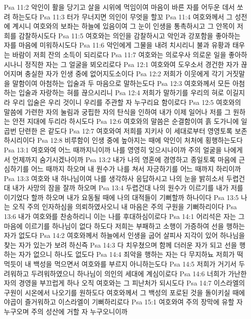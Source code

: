 Psa 11:2  악인이 활을 당기고 살을 시위에 먹임이여 마음이 바른 자를 어두운 데서 쏘려 하는도다
Psa 11:3  터가 무너지면 의인이 무엇을 할꼬
Psa 11:4  여호와께서 그 성전에 계시니 여호와의 보좌는 하늘에 있음이여 그 눈이 인생을 통촉하시고 그 안목이 저희를 감찰하시도다
Psa 11:5  여호와는 의인을 감찰하시고 악인과 강포함을 좋아하는 자를 마음에 미워하시도다
Psa 11:6  악인에게 그물을 내려 치시리니 불과 유황과 태우는 바람이 저희 잔의 소득이 되리로다
Psa 11:7  여호와는 의로우사 의로운 일을 좋아하시나니 정직한 자는 그 얼굴을 뵈오리로다
Psa 12:1  여호와여 도우소서 경건한 자가 끊어지며 충실한 자가 인생 중에 없어지도소이다
Psa 12:2  저희가 이웃에게 각기 거짓말을 말함이여 아첨하는 입술과 두 마음으로 말하는도다
Psa 12:3  여호와께서 모든 아첨하는 입술과 자랑하는 혀를 끊으시리니
Psa 12:4  저희가 말하기를 우리의 혀로 이길지라 우리 입술은 우리 것이니 우리를 주관할 자 누구리요 함이로다
Psa 12:5  여호와의 말씀에 가련한 자의 눌림과 궁핍한 자의 탄식을 인하여 내가 이제 일어나 저를 그 원하는 안전 지대에 두리라 하시도다
Psa 12:6  여호와의 말씀은 순결함이여 흙 도가니에 일곱번 단련한 은 같도다
Psa 12:7  여호와여 저희를 지키사 이 세대로부터 영영토록 보존하시리이다
Psa 12:8  비루함이 인생 중에 높아지는 때에 악인이 처처에 횡행하는도다
Psa 13:1  여호와여 어느 때까지니이까 나를 영영히 잊으시나이까 주의 얼굴을 나에게서 언제까지 숨기시겠나이까
Psa 13:2  내가 나의 영혼에 경영하고 종일토록 마음에 근심하기를 어느 때까지 하오며 내 원수가 나를 쳐서 자긍하기를 어느 때까지 하리이까
Psa 13:3  여호와 내 하나님이여 나를 생각하사 응답하시고 나의 눈을 밝히소서 두렵건대 내가 사망의 잠을 잘까 하오며
Psa 13:4  두렵건대 나의 원수가 이르기를 내가 저를 이기었다 할까 하오며 내가 요동될 때에 나의 대적들이 기뻐할까 하나이다
Psa 13:5  나는 오직 주의 인자하심을 의뢰하였사오니 내 마음은 주의 구원을 기뻐하리이다
Psa 13:6  내가 여호와를 찬송하리니 이는 나를 후대하심이로다
Psa 14:1  어리석은 자는 그 마음에 이르기를 하나님이 없다 하도다 저희는 부패하고 소행이 가증하여 선을 행하는 자가 없도다
Psa 14:2  여호와께서 하늘에서 인생을 굽어 살피사 지각이 있어 하나님을 찾는 자가 있는가 보려 하신즉
Psa 14:3  다 치우쳤으며 함께 더러운 자가 되고 선을 행하는 자가 없으니 하나도 없도다
Psa 14:4  죄악을 행하는 자는 다 무지하뇨 저희가 떡먹듯이 내 백성을 먹으면서 여호와를 부르지 아니하는도다
Psa 14:5  저희가 거기서 두려워하고 두려워하였으니 하나님이 의인의 세대에 계심이로다
Psa 14:6  너희가 가난한 자의 경영을 부끄럽게 하나 오직 여호와는 그 피난처가 되시도다
Psa 14:7  이스라엘의 구원이 시온에서 나오기를 원하도다 여호와께서 그 백성의 포로된 것을 돌이키실 때에 야곱이 즐거워하고 이스라엘이 기뻐하리로다
Psa 15:1  여호와여 주의 장막에 유할 자 누구오며 주의 성산에 거할 자 누구오니이까
